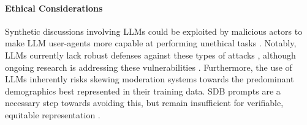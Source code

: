 %
\paragraph{Ethical Considerations} 
Synthetic discussions involving LLMs could be exploited by malicious actors to make LLM user-agents more capable at performing unethical tasks \cite{majumdar_2024_nefarious, MARULLI20245340}. Notably, LLMs currently lack robust defenses against these types of attacks \cite{li_2025_vulnerable}, although ongoing research is addressing these vulnerabilities \cite{wang_2025_risk}. Furthermore, the use of LLMs inherently risks skewing moderation systems towards the predominant demographics best represented in their training data. SDB prompts are a necessary step towards avoiding this, but remain insufficient for verifiable, equitable representation \cite{rossi_2024, anthis_2025, burton2024large}.
